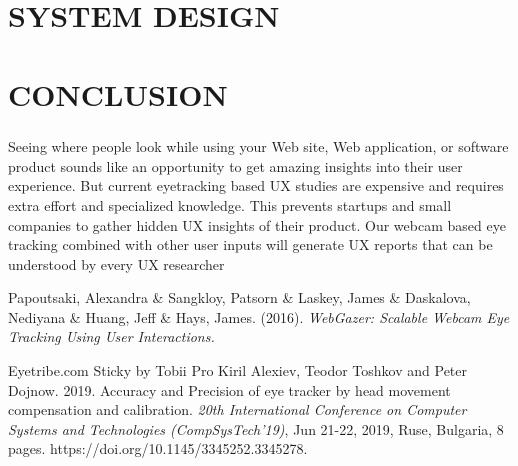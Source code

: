 \documentclass[12pt,a4paper,final]{extreport}
\begin{document}
\newpage
\chapter{SYSTEM DESIGN}

\newpage
\chapter{CONCLUSION }
\paragraph{}
Seeing where people look while using your Web site, Web application, or software product
sounds like an opportunity to get amazing insights into their user experience. But current eyetracking based UX studies are expensive and requires extra effort and specialized knowledge.
This prevents startups and small companies to gather hidden UX insights of their product. Our
webcam based eye tracking combined with other user inputs will generate UX reports that can
be understood by every UX researcher
\newpage
{}
\begin{thebibliography}{}
    Papoutsaki, Alexandra \& Sangkloy, Patsorn \& Laskey, James \& Daskalova, Nediyana \& Huang, Jeff \& Hays, James. (2016). \emph{WebGazer: Scalable Webcam Eye Tracking Using User Interactions.}

    Eyetribe.com
    Sticky by Tobii Pro
    Kiril Alexiev, Teodor Toshkov and Peter Dojnow. 2019. Accuracy and Precision of eye tracker by head movement compensation and calibration. \emph{20th International Conference on Computer Systems and Technologies
(CompSysTech'19)}, Jun 21-22, 2019, Ruse, Bulgaria, 8 pages.
https://doi.org/10.1145/3345252.3345278.


\end{thebibliography}
\end{document}
